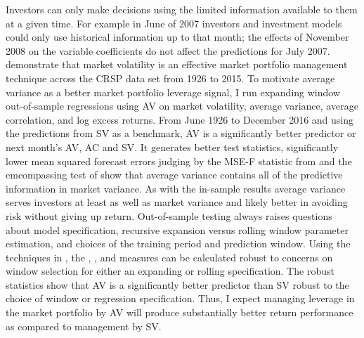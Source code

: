 Investors can only make decisions using the limited information available to them at a given time. For example in June of 2007 investors and investment models could only use historical information up to that month; the effects of November 2008 on the variable coefficients do not affect the predictions for July 2007. \citet{moreira_volatility-managed_2017} demonstrate that market volatility is an effective market portfolio management technique across the CRSP data set from 1926 to 2015. To motivate average variance as a better market portfolio leverage signal, I run expanding window out-of-sample regressions using AV on market volatility, average variance, average correlation, and log excess returns. From June 1926 to December 2016 and using the predictions from SV as a benchmark, AV is a significantly better predictor or next month’s AV, AC and SV. It generates better \citet{Diebold1995} test statistics, significantly lower mean squared forecast errors judging by the MSE-F statistic from \citet{mccracken_asymptotics_2007} and the emcompassing test of \citet{harvey_tests_1998} show that average variance contains all of the predictive information in market variance. As with the in-sample results average variance serves investors at least as well as market variance and likely better in avoiding risk without giving up return. Out-of-sample testing always raises questions about model specification, recursive expansion versus rolling window parameter estimation, and choices of the training period and prediction window. Using the techniques in \citet{rossi_out--sample_2012}, the \citet{Diebold1995}, \citet{mccracken_asymptotics_2007}, and \citet{harvey_tests_1998} measures can be calculated robust to concerns on window selection for either an expanding or rolling specification.
The \citet{rossi_out--sample_2012}  robust statistics show that AV is a significantly better predictor than SV robust to the choice of window or regression specification. Thus, I expect managing leverage in the market portfolio by AV will produce substantially better return performance as compared to management by SV.

